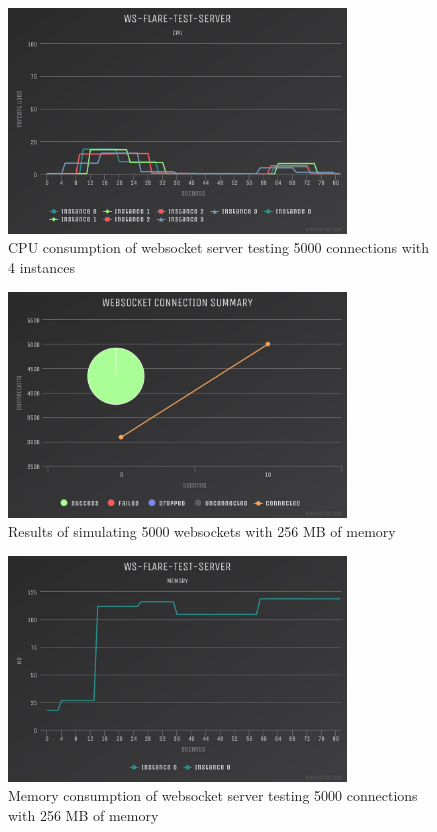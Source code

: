 \begin{figure}[H]
  \centering
    \includegraphics[width=0.8\textwidth]{figures/experiments/experiment-1/node-js/cpu-5000-4-instances.png}
    \caption{CPU consumption of websocket server testing 5000 connections with 4 instances}
    \label{fig:experiment-1-cpu-5000-4-instances}
\end{figure}

\begin{figure}[H]
  \centering
    \includegraphics[width=0.8\textwidth]{figures/experiments/experiment-1/node-js/conn-summary-5000-256-memory.png}
    \caption{Results of simulating 5000 websockets with 256 MB of memory}
    \label{fig:experiment-1-conn-summary-5000-1-instances-256-mem}
\end{figure}

\begin{figure}[H]
  \centering
    \includegraphics[width=0.8\textwidth]{figures/experiments/experiment-1/node-js/memory-5000-256-memory.png}
    \caption{Memory consumption of websocket server testing 5000 connections with 256 MB of memory}
    \label{fig:experiment-1-memory-5000-1-instances-256-mem}
\end{figure}

